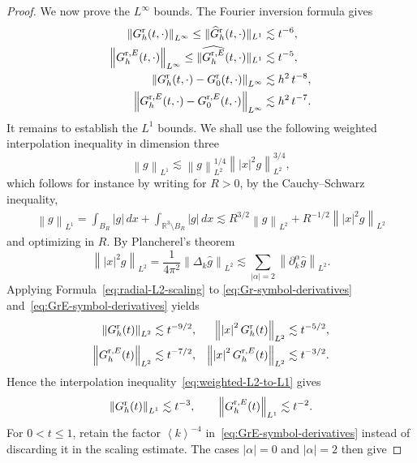 \documentclass[a4paper,12pt]{amsart} %
\theoremstyle{plain}
\theoremstyle{definition}
\newcommand		{\RR}		{\mathbb R}			%
\newcommand		{\R}		{\RR}
\newcommand		{\Rd}		{\R^3}
\newcommand		{\lt}			{\left}				%
\newcommand		{\rt}			{\right}			%
\renewcommand	{\(}			{\lt(}
\renewcommand	{\)}			{\rt)}
\newcommand		{\bangle}[1]	{\lt\langle #1\rt\rangle}
\newcommand		{\weight}[1]	{\bangle{#1}}	%
\newcommand		{\n}[1]			{\lt\lvert{#1}\rt\rvert}	%
\newcommand		{\nrm}[1]		{\lt\lVert{#1}\rt\rVert}		%
\newcommand		{\snrm}[1]		{\lVert #1\rVert}
\newcommand		{\Nrm}[2]		{\nrm{#1}_{#2}}
\newcommand		{\sNrm}[2]		{\snrm{#1}_{#2}}
\newcommand	{\h}			{h}
\newcommand		{\Gr}			{G^{\textnormal{r}}}
\newcommand		{\GrE}			{G^{\textnormal{r},E}}
\newcommand		{\hatG}			{\widehat{G}}
\newcommand		{\hatGr}		{\hatG^{\textnormal{r}}}
\begin{document}
\begin{proof}
		We now prove the $L^\infty$ bounds. The Fourier inversion formula gives 
		\begin{align*}
			\Nrm{\Gr_\h(t,\cdot)}{L^\infty} \leq\sNrm{\hatGr_\h(t,\cdot)}{L^1} &\lesssim t^{-6},
			\\
			\Nrm{\GrE_\h(t,\cdot)}{L^\infty} \leq\sNrm{\widehat{\GrE_\h}(t,\cdot)}{L^1} &\lesssim t^{-5},
			\\
			\Nrm{\Gr_\h(t,\cdot)-\Gr_0(t,\cdot)}{L^\infty} &\lesssim \h^2\, t^{-8},
			\\
			\Nrm{\GrE_\h(t,\cdot)-\GrE_0(t,\cdot)}{L^\infty} &\lesssim \h^2 \, t^{-7}.
		\end{align*}
		It remains to establish the $L^1$ bounds. We shall use the following weighted interpolation inequality in dimension three
		\begin{equation}\label{eq:weighted-L2-to-L1}
			\Nrm{g}{L^1} \lesssim \Nrm{g}{L^2}^{1/4} \Nrm{\n{x}^2g}{L^2}^{3/4} ,
		\end{equation}
		which follows for instance by writing for $R>0$, by the Cauchy--Schwarz inequality,
		\begin{align*}
			\Nrm{g}{L^1} = \int_{B_R} \n{g} \, dx + \int_{\Rd\setminus B_R} \n{g} \, dx 
			\lesssim R^{3/2}\Nrm{g}{L^2} + R^{-1/2}\Nrm{\n{x}^2g}{L^2}
		\end{align*}
		and optimizing in $R$. By Plancherel's theorem
		\begin{equation}\label{eq:weighted-plancherel}
			\Nrm{\n{x}^2g}{L^2}
			=\frac{1}{4\pi^2} \Nrm{\Delta_k\widehat g}{L^2}
			\lesssim
			\sum_{\n{\alpha}=2}
			\Nrm{\partial_k^\alpha\widehat g}{L^2}.
		\end{equation}
		Applying Formula~\eqref{eq:radial-L2-scaling} to \eqref{eq:Gr-symbol-derivatives} and~\eqref{eq:GrE-symbol-derivatives} yields
		\begin{align*}
			\Nrm{\Gr_\h(t)}{L^2} &\lesssim t^{-9/2},
			&\Nrm{\n{x}^2\Gr_\h(t)}{L^2}
			&\lesssim t^{-5/2},\\
			\Nrm{\GrE_\h(t)}{L^2}
			&\lesssim t^{-7/2},
			&\Nrm{\n{x}^2\GrE_\h(t)}{L^2}
			&\lesssim t^{-3/2}.
		\end{align*}
		Hence the interpolation inequality~\eqref{eq:weighted-L2-to-L1} gives
		\begin{equation*}
			\Nrm{\Gr_\h(t)}{L^1}\lesssim t^{-3},
			\qquad
			\Nrm{\GrE_\h(t)}{L^1}\lesssim t^{-2}.
		\end{equation*}
		For $0<t\leq1$, retain the factor $\weight{k}^{-4}$ in~\eqref{eq:GrE-symbol-derivatives} instead of discarding it in the scaling estimate. The cases $\n{\alpha}=0$ and $\n{\alpha}=2$ then give

\end{proof}
\end{document}
